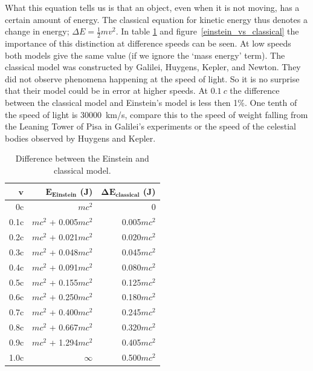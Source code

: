\documentclass[12pt,a4paper]{article}
\numberwithin{equation}{section}
\numberwithin{figure}{section}
\numberwithin{table}{section}
\begin{document}
What this equation tells us is that an object, even when it is not moving, has a certain amount of energy. The classical equation for kinetic energy thus denotes a change in energy; $\Delta E=\frac{1}{2}mv^2$. In table \ref{tab:einstein1} and figure~\ref{einstein_vs_classical} the importance of this distinction at difference speeds can be seen. At low speeds both models give the same value (if we ignore the `mass energy' term). The classical model was constructed by Galilei, Huygens, Kepler, and Newton. They did not observe phenomena happening at the speed of light. So it is no surprise that their model could be in error at higher speeds. At $0.1~c$ the difference between the classical model and Einstein's model is less then 1\%. One tenth of the speed of light is 30000~km/s, compare this to the speed of weight falling from the Leaning Tower of Pisa in Galilei's experiments or the speed of the celestial bodies observed by Huygens and Kepler.
\begin{table}
\centering
\begin{tabular}{|r|r|r|}
\hline $\mathbf{v}$ & $\mathbf{E_{Einstein}}$ (J) & $\mathbf{\Delta E_{classical}}$ (J) \\ 
\hline 0c & $mc^2$ & 0 \\ 
\hline 0.1c & $mc^2$ + 0.005$mc^2$ & 0.005$mc^2$ \\ 
\hline 0.2c & $mc^2$ + 0.021$mc^2$ & 0.020$mc^2$ \\ 
\hline 0.3c & $mc^2$ + 0.048$mc^2$ & 0.045$mc^2$ \\ 
\hline 0.4c & $mc^2$ + 0.091$mc^2$ & 0.080$mc^2$ \\ 
\hline 0.5c & $mc^2$ + 0.155$mc^2$ & 0.125$mc^2$ \\ 
\hline 0.6c & $mc^2$ + 0.250$mc^2$ & 0.180$mc^2$ \\ 
\hline 0.7c & $mc^2$ + 0.400$mc^2$ & 0.245$mc^2$ \\ 
\hline 0.8c & $mc^2$ + 0.667$mc^2$ & 0.320$mc^2$ \\ 
\hline 0.9c & $mc^2$ + 1.294$mc^2$ & 0.405$mc^2$ \\ 
\hline 1.0c & $\infty$ & 0.500$mc^2$ \\ 
\hline 
\end{tabular}
\caption{Difference between the Einstein and classical model.}\label{tab:einstein1}
\end{table}
\end{document}
